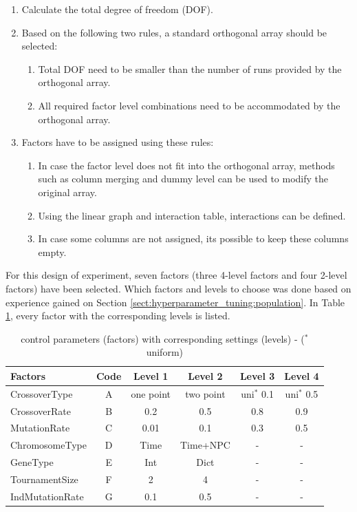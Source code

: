 \begin{enumerate}
	\item Calculate the total degree of freedom (DOF). 
	\item Based on the following two rules, a standard orthogonal array should be selected:
	\begin{enumerate}
		\item Total DOF need to be smaller than the number of runs provided by the orthogonal array.
		\item All required factor level combinations need to be accommodated by the orthogonal array.
	\end{enumerate}
	
	\item Factors have to be assigned using these rules: 
	\begin{enumerate}
		\item In case the factor level does not fit into the orthogonal array, methods such as column merging and dummy level can be used to modify the original array.
		\item Using the linear graph and interaction table, interactions can be defined. 
		\item In case some columns are not assigned, its possible to keep these columns empty.
	\end{enumerate}
\end{enumerate}

For this design of experiment, seven factors (three 4-level factors and four 2-level factors) have been selected. Which factors and levels to choose was done based on experience gained on Section \ref{sect:hyperparameter_tuning:population}. In Table \ref{tab:hyperparameter_tuning:settings_to_level}, every factor with the corresponding levels is listed.

\begin{table}[ht]
	\centering
	\small
	\begin{tabular}{ l|c|cccc }
		\hline
		Factors & Code & Level 1 & Level 2 & Level 3 & Level 4\\
		\hline
		CrossoverType 		& A & one point & two point & uni$^*$ 0.1 & uni$^*$ 0.5\\
		CrossoverRate    	& B & 0.2 & 0.5 & 0.8 & 0.9\\
		MutationRate   		& C & 0.01 & 0.1 & 0.3 & 0.5\\
		ChromosomeType   	& D & Time & Time+NPC & - & -\\
		GeneType			& E & Int & Dict & - & -\\
		TournamentSize 		& F & 2 & 4 & - & -\\
		IndMutationRate		& G & 0.1 & 0.5 & - & -\\
		\hline
	\end{tabular}
\caption{control parameters (factors) with corresponding settings (levels) - ($^*$uniform)}
\label{tab:hyperparameter_tuning:settings_to_level}
\end{table}

